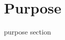 \documentclass[../../../../dd.tex]{subfiles}
\begin{document}
	\section{Purpose}

	purpose section
\end{document}
